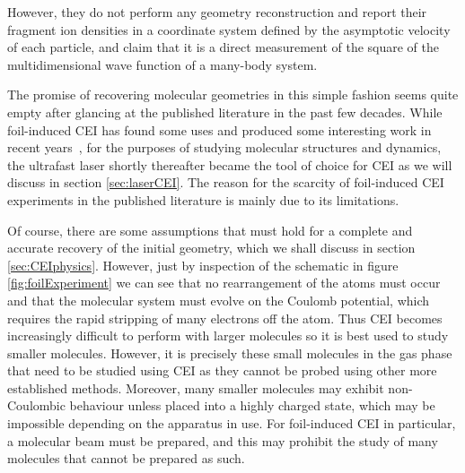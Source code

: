 However, they do not perform any geometry reconstruction and report their fragment ion densities in a coordinate system defined by the asymptotic velocity of each particle, and claim that it is a direct measurement of the square of the multidimensional wave function of a many-body system.

The promise of recovering molecular geometries in this simple fashion seems quite empty after glancing at the published literature in the past few decades. While foil-induced CEI has found some uses and produced some interesting work in recent years\footnotemark~, for the purposes of studying molecular structures and dynamics, the ultrafast laser shortly thereafter became the tool of choice for CEI as we will discuss in section \ref{sec:laserCEI}. The reason for the scarcity of foil-induced CEI experiments in the published literature is mainly due to its limitations.


Of course, there are some assumptions that must hold for a complete and accurate recovery of the initial geometry, which we shall discuss in section \ref{sec:CEIphysics}. However, just by inspection of the schematic in figure \ref{fig:foilExperiment} we can see that no rearrangement of the atoms must occur\footnotemark~ and that the molecular system must evolve on the Coulomb potential, which requires the rapid stripping of many electrons off the atom. Thus CEI becomes increasingly difficult to perform with larger molecules so it is best used to study smaller molecules. However, it is precisely these small molecules in the gas phase that need to be studied using CEI as they cannot be probed using other more established methods. Moreover, many smaller molecules may exhibit non-Coulombic behaviour unless placed into a highly charged state, which may be impossible depending on the apparatus in use. For foil-induced CEI in particular, a molecular beam must be prepared, and this may prohibit the study of many molecules that cannot be prepared as such.


